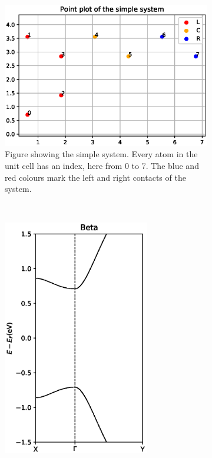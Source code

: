 \begin{figure}[h]
	\centering
	\begin{subfigure}[b]{0.45\textwidth}
		\includegraphics[width=\textwidth]{Figures/pointplot.eps}
		\caption{Figure showing the simple system. Every atom in the unit cell has an index, here from 0 to 7. The blue and red colours mark the left and right contacts of the system.}
		\label{pointplot}
	\end{subfigure}
	~ %
	\begin{subfigure}[b]{0.45\textwidth}
		\includegraphics[width=0.7\textwidth]{Figures/BetaBandstructures.eps}

\end{subfigure}
\end{figure}
